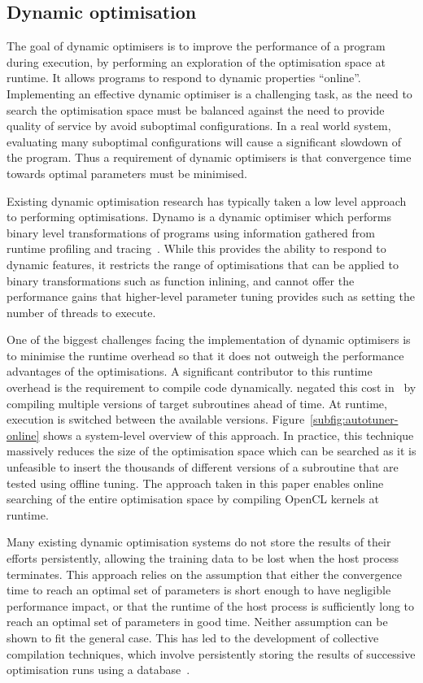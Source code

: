 \subsection{Dynamic optimisation}\label{subsec:dynamic-optimisation}
The goal of dynamic optimisers is to improve the performance of a
program during execution, by performing an exploration of the
optimisation space at runtime. It allows programs to respond to
dynamic properties ``online''. Implementing an effective dynamic
optimiser is a challenging task, as the need to search the
optimisation space must be balanced against the need to provide
quality of service by avoid suboptimal configurations. In a real world
system, evaluating many suboptimal configurations will cause a
significant slowdown of the program. Thus a requirement of dynamic
optimisers is that convergence time towards optimal parameters must be
minimised.

Existing dynamic optimisation research has typically taken a low level
approach to performing optimisations. Dynamo is a dynamic optimiser
which performs binary level transformations of programs using
information gathered from runtime profiling and
tracing~\cite{Bala2000}. While this provides the ability to respond to
dynamic features, it restricts the range of optimisations that can be
applied to binary transformations such as function inlining, and
cannot offer the performance gains that higher-level parameter tuning
provides such as setting the number of threads to execute.

One of the biggest challenges facing the implementation of dynamic
optimisers is to minimise the runtime overhead so that it does not
outweigh the performance advantages of the optimisations. A
significant contributor to this runtime overhead is the requirement to
compile code dynamically. \citeauthor{Fursin2005} negated this cost
in~\cite{Fursin2005} by compiling multiple versions of target
subroutines ahead of time. At runtime, execution is switched between
the available versions. Figure~\ref{subfig:autotuner-online} shows a
system-level overview of this approach. In practice, this technique
massively reduces the size of the optimisation space which can be
searched as it is unfeasible to insert the thousands of different
versions of a subroutine that are tested using offline tuning. The
approach taken in this paper enables online searching of the entire
optimisation space by compiling OpenCL kernels at runtime.

Many existing dynamic optimisation systems do not store the results of
their efforts persistently, allowing the training data to be lost when
the host process terminates. This approach relies on the assumption
that either the convergence time to reach an optimal set of parameters
is short enough to have negligible performance impact, or that the
runtime of the host process is sufficiently long to reach an optimal
set of parameters in good time. Neither assumption can be shown to fit
the general case. This has led to the development of collective
compilation techniques, which involve persistently storing the results
of successive optimisation runs using a database~\cite{Fursin2010}.

